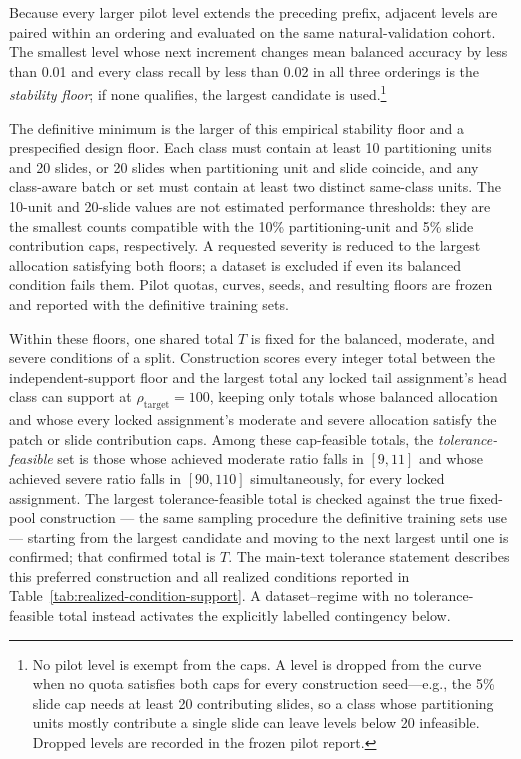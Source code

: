 \documentclass[11pt]{article}
\begin{document}
\noindent Because every larger pilot level extends the preceding prefix, adjacent levels are paired within an ordering and evaluated on the same natural-validation cohort. The smallest level whose next increment changes mean balanced accuracy by less than \num{0.01} and every class recall by less than \num{0.02} in all three orderings is the \emph{stability floor}; if none qualifies, the largest candidate is used.\footnote{No pilot level is exempt from the caps. A level is dropped from the curve when no quota satisfies both caps for every construction seed---e.g., the \num{5}\% slide cap needs at least 20 contributing slides, so a class whose partitioning units mostly contribute a single slide can leave levels below 20 infeasible. Dropped levels are recorded in the frozen pilot report.}

The definitive minimum is the larger of this empirical stability floor and a prespecified design floor. Each class must contain at least 10 partitioning units and 20 slides, or 20 slides when partitioning unit and slide coincide, and any class-aware batch or set must contain at least two distinct same-class units. The 10-unit and 20-slide values are not estimated performance thresholds: they are the smallest counts compatible with the 10\% partitioning-unit and 5\% slide contribution caps, respectively. A requested severity is reduced to the largest allocation satisfying both floors; a dataset is excluded if even its balanced condition fails them. Pilot quotas, curves, seeds, and resulting floors are frozen and reported with the definitive training sets.

Within these floors, one shared total $T$ is fixed for the balanced, moderate, and severe conditions of a split. Construction scores every integer total between the independent-support floor and the largest total any locked tail assignment's head class can support at $\rho_{\mathrm{target}}=100$, keeping only totals whose balanced allocation and whose every locked assignment's moderate and severe allocation satisfy the patch or slide contribution caps. Among these cap-feasible totals, the \emph{tolerance-feasible} set is those whose achieved moderate ratio falls in $[9,11]$ and whose achieved severe ratio falls in $[90,110]$ simultaneously, for every locked assignment. The largest tolerance-feasible total is checked against the true fixed-pool construction --- the same sampling procedure the definitive training sets use --- starting from the largest candidate and moving to the next largest until one is confirmed; that confirmed total is $T$. The main-text tolerance statement describes this preferred construction and all realized conditions reported in Table~\ref{tab:realized-condition-support}. A dataset--regime with no tolerance-feasible total instead activates the explicitly labelled contingency below.
\end{document}
